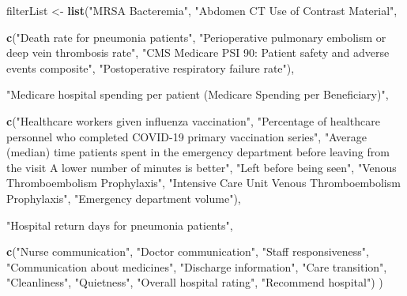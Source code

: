 \documentclass[
]{article}
\newenvironment{Shaded}{\begin{snugshade}}{\end{snugshade}}
\newcommand{\FunctionTok}[1]{\textcolor[rgb]{0.13,0.29,0.53}{\textbf{#1}}}
\newcommand{\NormalTok}[1]{#1}
\newcommand{\OtherTok}[1]{\textcolor[rgb]{0.56,0.35,0.01}{#1}}
\newcommand{\StringTok}[1]{\textcolor[rgb]{0.31,0.60,0.02}{#1}}
\begin{document}
\begin{Shaded}
\begin{Highlighting}[]
\NormalTok{filterList }\OtherTok{\textless{}{-}} \FunctionTok{list}\NormalTok{(}\StringTok{"MRSA Bacteremia"}\NormalTok{, }
                   \StringTok{"Abdomen CT Use of Contrast Material"}\NormalTok{, }
                   
                   \FunctionTok{c}\NormalTok{(}\StringTok{"Death rate for pneumonia patients"}\NormalTok{, }
                     \StringTok{"Perioperative pulmonary embolism or deep vein thrombosis rate"}\NormalTok{,}
                     \StringTok{"CMS Medicare PSI 90: Patient safety and adverse events composite"}\NormalTok{, }
                     \StringTok{"Postoperative respiratory failure rate"}\NormalTok{),}
                   
                   \StringTok{"Medicare hospital spending per patient (Medicare Spending per Beneficiary)"}\NormalTok{,}
                   
                   \FunctionTok{c}\NormalTok{(}\StringTok{"Healthcare workers given influenza vaccination"}\NormalTok{, }
                     \StringTok{"Percentage of healthcare personnel who completed COVID{-}19 primary vaccination series"}\NormalTok{, }
                     \StringTok{"Average (median) time patients spent in the emergency department before leaving from the visit A lower number of minutes is better"}\NormalTok{, }
                     \StringTok{"Left before being seen"}\NormalTok{,}
                     \StringTok{"Venous Thromboembolism Prophylaxis"}\NormalTok{, }
                     \StringTok{"Intensive Care Unit Venous Thromboembolism Prophylaxis"}\NormalTok{, }
                     \StringTok{"Emergency department volume"}\NormalTok{),}
                   
                   \StringTok{"Hospital return days for pneumonia patients"}\NormalTok{,}
                   
                   \FunctionTok{c}\NormalTok{(}\StringTok{"Nurse communication"}\NormalTok{,}
                     \StringTok{"Doctor communication"}\NormalTok{,}
                     \StringTok{"Staff responsiveness"}\NormalTok{,}
                     \StringTok{"Communication about medicines"}\NormalTok{,}
                     \StringTok{"Discharge information"}\NormalTok{,}
                     \StringTok{"Care transition"}\NormalTok{,}
                     \StringTok{"Cleanliness"}\NormalTok{,}
                     \StringTok{"Quietness"}\NormalTok{,}
                     \StringTok{"Overall hospital rating"}\NormalTok{,}
                     \StringTok{"Recommend hospital"}\NormalTok{)}
\NormalTok{)}
\end{Highlighting}
\end{Shaded}
\end{document}
